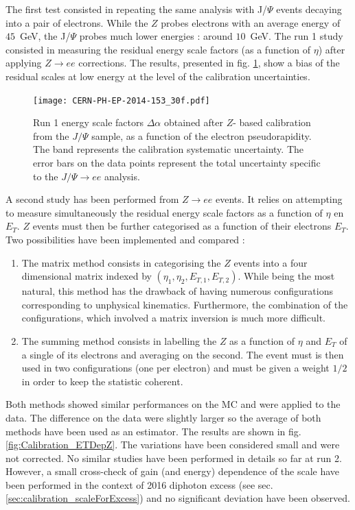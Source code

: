 The first test consisted in repeating the same analysis with J/$\Psi$ events decaying into a pair of electrons.
While the $Z$ probes electrons with an average energy of $45$~GeV, the J/$\Psi$ probes much lower energies : around $10$~GeV.
The run 1 study consisted in measuring the residual energy scale factors (as a function of $\eta$) after applying $Z\rightarrow ee$ corrections.
The results, presented in fig. \ref{fig:Calibration_JPsiCheck}, show a bias of the residual scales at low energy at the level of the calibration uncertainties.

\begin{figure}[htbp]
\centering
\texttt{[image: CERN-PH-EP-2014-153\_30f.pdf]}
\caption{\label{fig:Calibration_JPsiCheck}
  Run 1 energy scale factors $\Delta\alpha$ obtained after $Z$- based
  calibration from the $J/\Psi$ sample, as a function of the electron
  pseudorapidity. The band represents the calibration systematic uncertainty. The error bars on the data points represent
  the total uncertainty specific to the $J/\Psi\rightarrow ee$ analysis.
  \cite{CERN-PH-EP-2014-153}}
\end{figure}

A second study has been performed from $Z\rightarrow ee$ events.
It relies on attempting to measure simultaneously the residual energy scale factors as a function of $\eta$ en $E_T$.
$Z$ events must then be further categorised as a function of their electrons $E_T$.
Two possibilities have been implemented and compared :
\begin{enumerate}
\item The matrix method consists in categorising the $Z$ events into a four dimensional matrix indexed by $(\eta_1, \eta_2, E_{T,1}, E_{T,2})$.
  While being the most natural, this method has the drawback of having numerous configurations corresponding to unphysical kinematics.
  Furthermore, the combination of the configurations, which involved a matrix inversion is much more difficult.

\item The summing method consists in labelling the $Z$ as a function of $\eta$ and $E_T$ of a single of its electrons and averaging on the second.
  The event must is then used in two configurations (one per electron) and must be given a weight $1/2$ in order to keep the statistic coherent.
\end{enumerate}
Both methods showed similar performances on the MC and were applied to the data.
The difference on the data were slightly larger so the average of both methods have been used as an estimator.
The results are shown in fig. \ref{fig:Calibration_ETDepZ}.
The variations have been considered small and were not corrected.
No similar studies have been performed in details so far at run 2.
However, a small cross-check of gain (and energy) dependence of the scale have been performed in the context of 2016 diphoton excess (see sec. \ref{sec:calibration_scaleForExcess}) and no significant deviation have been observed.

